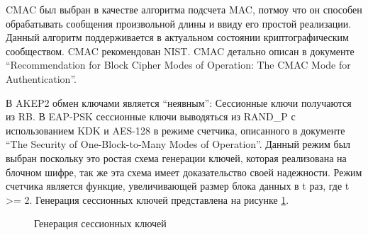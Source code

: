 CMAC был выбран в качестве алгоритма подсчета MAC, потмоу что он способен обрабатывать сообщения произвольной длины и ввиду его простой реализации. Данный алгоритм поддерживается в актуальном состоянии криптографическим сообществом. CMAC рекомендован NIST. CMAC детально описан в документе ``Recommendation for Block Cipher Modes of Operation: The CMAC Mode for Authentication''.

В AKEP2 обмен ключами является ``неявным'': Сессионные ключи получаются из RB. В EAP-PSK сессионные ключи выводяться из RAND\_P с использованием KDK и AES-128 в режиме счетчика, описанного в документе ``The Security of One-Block-to-Many Modes of Operation''. Данный режим был выбран поскольку это ростая схема генерации ключей, которая реализована на блочном шифре, так же эта схема имеет доказательство своей надежности. Режим счетчика является функцие, увеличивающей размер блока данных в t раз, где t >= 2. Генерация сессионных ключей представлена на рисунке \ref{img:sk_derivation}.

\begin{figure}[h!]
\caption{Генерация сессионных ключей}
\label{img:sk_derivation}
\end{figure}
